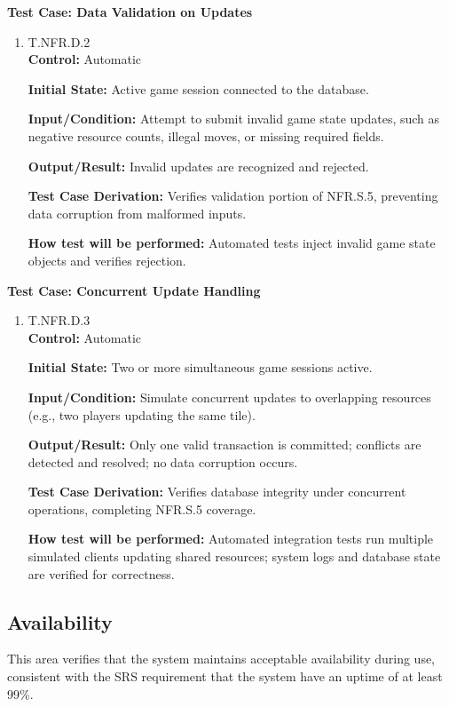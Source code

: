 \documentclass[12pt, titlepage]{article}
\begin{document}
\textbf{Test Case: Data Validation on Updates}

\begin{enumerate}
\item{\hypertarget{T.NFR.D.2}{T.NFR.D.2}\\}
\textbf{Control:} Automatic

\textbf{Initial State:} Active game session connected to the database.

\textbf{Input/Condition:} Attempt to submit invalid game state updates, such as negative resource counts, illegal moves, or missing required fields.

\textbf{Output/Result:} Invalid updates are recognized and rejected.

\textbf{Test Case Derivation:} Verifies validation portion of NFR.S.5, preventing data corruption from malformed inputs.

\textbf{How test will be performed:} Automated tests inject invalid game state objects and verifies rejection.
\end{enumerate}

\textbf{Test Case: Concurrent Update Handling}

\begin{enumerate}
\item{\hypertarget{T.NFR.D.3}{T.NFR.D.3}\\}
\textbf{Control:} Automatic

\textbf{Initial State:} Two or more simultaneous game sessions active.

\textbf{Input/Condition:} Simulate concurrent updates to overlapping resources (e.g., two players updating the same tile).

\textbf{Output/Result:} Only one valid transaction is committed; conflicts are detected and resolved; no data corruption occurs.

\textbf{Test Case Derivation:} Verifies database integrity under concurrent operations, completing NFR.S.5 coverage.

\textbf{How test will be performed:} Automated integration tests run multiple simulated clients updating shared resources; system logs and database state are verified for correctness.
\end{enumerate}


\subsection{Availability}

This area verifies that the system maintains acceptable availability during use,
consistent with the SRS requirement that the system have an uptime of at least 99\%.
\end{document}
